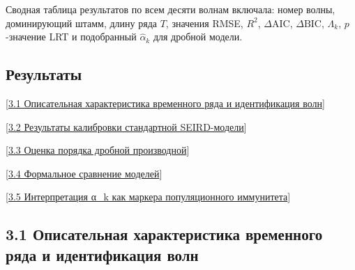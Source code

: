 \documentclass[12pt]{article}
\begin{document}
Сводная таблица результатов по всем десяти волнам включала: номер волны,
доминирующий штамм, длину ряда \(T\), значения RMSE, \(R^2\),
\(\Delta\text{AIC}\), \(\Delta\text{BIC}\), \(\Lambda_k\),
\(p\)-значение LRT и подобранный \(\hat{\alpha}_k\) для дробной модели.

\subsection{Результаты}\label{ux440ux435ux437ux443ux43bux44cux442ux430ux442ux44b}

{[}\hyperref[ux43eux43fux438ux441ux430ux442ux435ux43bux44cux43dux430ux44f-ux445ux430ux440ux430ux43aux442ux435ux440ux438ux441ux442ux438ux43aux430-ux432ux440ux435ux43cux435ux43dux43dux43eux433ux43e-ux440ux44fux434ux430-ux438-ux438ux434ux435ux43dux442ux438ux444ux438ux43aux430ux446ux438ux44f-ux432ux43eux43bux43d]{3.1
Описательная характеристика временного ряда и идентификация волн}{]}

{[}\hyperref[ux440ux435ux437ux443ux43bux44cux442ux430ux442ux44b-ux43aux430ux43bux438ux431ux440ux43eux432ux43aux438-ux441ux442ux430ux43dux434ux430ux440ux442ux43dux43eux439-seird-ux43cux43eux434ux435ux43bux438]{3.2
Результаты калибровки стандартной SEIRD-модели}{]}

{[}\hyperref[ux43eux446ux435ux43dux43aux430-ux43fux43eux440ux44fux434ux43aux430-ux434ux440ux43eux431ux43dux43eux439-ux43fux440ux43eux438ux437ux432ux43eux434ux43dux43eux439]{3.3
Оценка порядка дробной производной}{]}

{[}\hyperref[ux444ux43eux440ux43cux430ux43bux44cux43dux43eux435-ux441ux440ux430ux432ux43dux435ux43dux438ux435-ux43cux43eux434ux435ux43bux435ux439]{3.4
Формальное сравнение моделей}{]}

{[}\hyperref[ux438ux43dux442ux435ux440ux43fux440ux435ux442ux430ux446ux438ux44f-ux3b1_k-ux43aux430ux43a-ux43cux430ux440ux43aux435ux440ux430-ux43fux43eux43fux443ux43bux44fux446ux438ux43eux43dux43dux43eux433ux43e-ux438ux43cux43cux443ux43dux438ux442ux435ux442ux430]{3.5
Интерпретация α\_k как маркера популяционного иммунитета}{]}

\subsection{3.1 Описательная характеристика временного ряда и
идентификация
волн}\label{ux43eux43fux438ux441ux430ux442ux435ux43bux44cux43dux430ux44f-ux445ux430ux440ux430ux43aux442ux435ux440ux438ux441ux442ux438ux43aux430-ux432ux440ux435ux43cux435ux43dux43dux43eux433ux43e-ux440ux44fux434ux430-ux438-ux438ux434ux435ux43dux442ux438ux444ux438ux43aux430ux446ux438ux44f-ux432ux43eux43bux43d}
\end{document}
